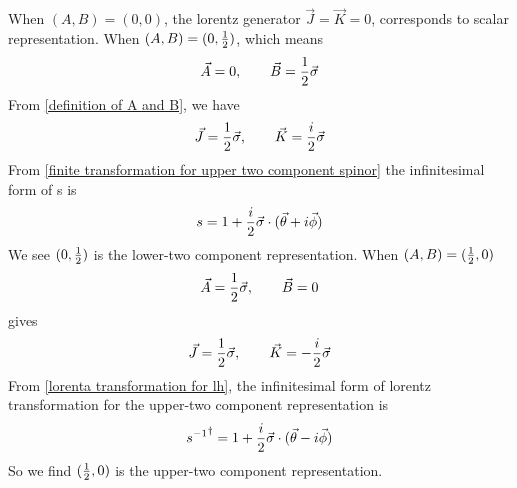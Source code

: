 When $(A,B)= (0,0)$, the lorentz generator $\vec{J}=\vec{K}=0$,  corresponds to scalar representation. 
When $(A,B)=(0,\frac{1}{2})$, which means
\begin{equation}\label{A,B value for (0,1/2)}
    \vec{A} = 0, \qquad \vec{B} = \frac{1}{2} \vec{\sigma} 
\end{equation}
From \eqref{definition of A and B}, we have
\begin{equation}
    \vec{J} = \frac{1}{2} \vec{\sigma},\qquad \vec{K}=  \frac{i}{2}\vec{\sigma}
\end{equation}
From  \eqref{finite transformation for upper two component spinor}
the infinitesimal form of s is
\begin{equation}
 s = 1 + \frac{i}{2} \vec{\sigma}\cdot(\vec{\theta}+i\vec{\phi})
\end{equation} 
We see $(0,\frac{1}{2})$ is the lower-two component representation.
When $(A,B)=(\frac{1}{2},0)$
\begin{equation}\label{A,B value for (1/2,0)}
    \vec{A}= \frac{1}{2} \vec{\sigma}, \qquad \vec{B} = 0 
\end{equation}
gives
\begin{equation}
    \vec{J} = \frac{1}{2} \vec{\sigma}, \qquad \vec{K} =  -\frac{i}{2}\vec{\sigma}
\end{equation}
From \eqref{lorenta transformation for lh}, the infinitesimal form of lorentz transformation for the upper-two component representation is
\begin{equation}
{s^{-1}}^{\dagger} = 1 + \frac{i}{2}\vec{\sigma}\cdot(\vec{\theta}-i\vec{\phi})
\end{equation}
So we find $(\frac{1}{2},0)$ is the upper-two component representation.

